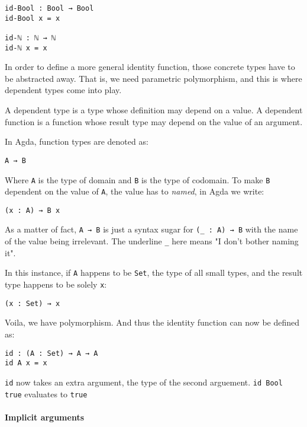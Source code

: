 \documentclass[14pt, a4paper]{article}
\begin{document}
\begin{lstlisting}
id-Bool : Bool → Bool
id-Bool x = x

id-ℕ : ℕ → ℕ
id-ℕ x = x
\end{lstlisting}

In order to define a more general identity function, those concrete types have
to be abstracted away. That is, we need parametric polymorphism, and this is
where dependent types come into play.

A dependent type is a type whose definition may depend on a value. A dependent
function is a function whose result type may depend on the value of an argument.

In Agda, function types are denoted as:

\begin{lstlisting}
A → B
\end{lstlisting}

Where {\lstinline|A|} is the type of domain and {\lstinline|B|} is the type of
codomain. To make {\lstinline|B|} dependent on the value of {\lstinline|A|}, the
value has to \textit{named}, in Agda we write:

\begin{lstlisting}
(x : A) → B x
\end{lstlisting}

As a matter of fact, {\lstinline|A → B|} is just a syntax sugar for {\lstinline|(_ : A) → B|}
with the name of the value being irrelevant. The underline {\lstinline|_|} here
means "I don't bother naming it".

In this instance, if {\lstinline|A|} happens to be {\lstinline|Set|}, the type
of all small types, and the result type happens to be solely {\lstinline|x|}:

\begin{lstlisting}
(x : Set) → x
\end{lstlisting}

Voila, we have polymorphism. And thus the identity function can now be defined as:

\begin{lstlisting}
id : (A : Set) → A → A
id A x = x
\end{lstlisting}

{\lstinline|id|} now takes an extra argument, the type of the second arguement.
{\lstinline|id Bool true|} evaluates to {\lstinline|true|}

\paragraph{Implicit arguments}
\end{document}
